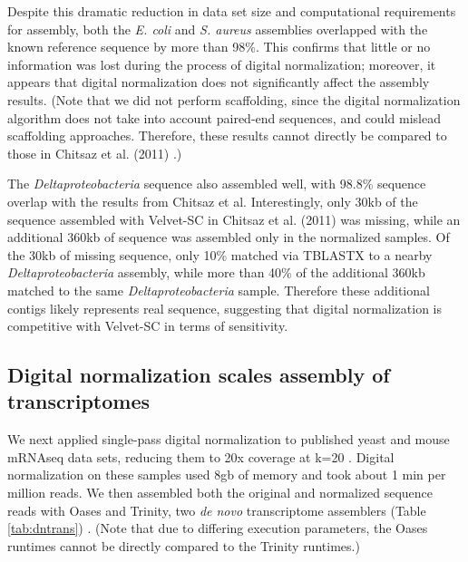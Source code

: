 \documentclass{pnastwo}
\begin{document}
\begin{article}

Despite this dramatic reduction in data set size and computational
requirements for assembly, both the {\em E. coli} and {\em S. aureus}
assemblies overlapped with the known reference sequence by more than
98\%.  This confirms that little or no information was lost during
the process of digital normalization; moreover, it appears that
digital normalization does not significantly affect the assembly results.
(Note that we did not perform scaffolding, since the digital
normalization algorithm does not take into account paired-end
sequences, and could mislead scaffolding approaches.  Therefore, these
results cannot directly be compared to those in Chitsaz et al. (2011)
\cite{pubmed21926975}.)

The {\em Deltaproteobacteria} sequence also assembled well, with
98.8\% sequence overlap with the results from Chitsaz et al.
Interestingly, only 30kb of the sequence assembled with Velvet-SC in
Chitsaz et al. (2011) was missing, while an additional 360kb of
sequence was assembled only in the normalized samples.  Of the 30kb of
missing sequence, only 10\% matched via TBLASTX to a nearby {\em
  Deltaproteobacteria} assembly, while more than 40\% of the
additional 360kb matched to the same {\em Deltaproteobacteria} sample.
Therefore these additional contigs likely represents real
sequence, suggesting that digital normalization is competitive with
Velvet-SC in terms of sensitivity.



\subsection{Digital normalization scales assembly of transcriptomes}

We next applied single-pass digital normalization to published yeast
and mouse mRNAseq data sets, reducing them to 20x coverage at k=20
\cite{pubmed21572440}.  Digital normalization on these samples used
8gb of memory and took about 1 min per million reads.  We then
assembled both the original and normalized sequence reads with Oases
and Trinity, two {\em de novo} transcriptome assemblers (Table
\ref{tab:dntrans}) \cite{pubmed22368243,pubmed21572440}.  (Note that
due to differing execution parameters, the Oases runtimes cannot be
directly compared to the Trinity runtimes.)


\end{article}
\end{document}
